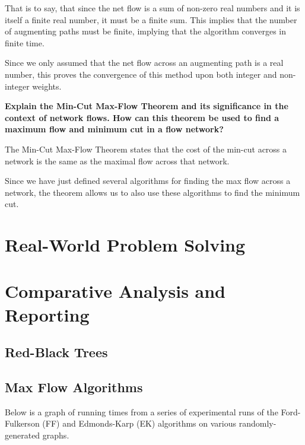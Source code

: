 \documentclass[12pt]{amsart}
\begin{document}
    That is to say, that since the net flow is a sum of non-zero
    real numbers and it is itself a finite real number, it must
    be a finite sum. This implies that the number of augmenting
    paths must be finite, implying that the algorithm converges
    in finite time.

    Since we only assumed that the net flow across an augmenting
    path is a real number, this proves the convergence of this
    method upon both integer and non-integer weights.

    \textbf{Explain the Min-Cut Max-Flow Theorem and its
    significance in the context of network flows. How can this
    theorem be used to find a maximum flow and minimum cut in a
    flow network?}


    The Min-Cut Max-Flow Theorem states that the cost of the
    min-cut across a network is the same as the maximal flow
    across that network.

    Since we have just defined several algorithms for finding
    the max flow across a network, the theorem allows us to also
    use these algorithms to find the minimum cut.

\section{Real-World Problem Solving}


\section{Comparative Analysis and Reporting}

\subsection{Red-Black Trees}


\subsection{Max Flow Algorithms}
    Below is a graph of running times from a series of
    experimental runs of the Ford-Fulkerson (FF) and
    Edmonds-Karp (EK) algorithms on various randomly-generated
    graphs.
\end{document}
